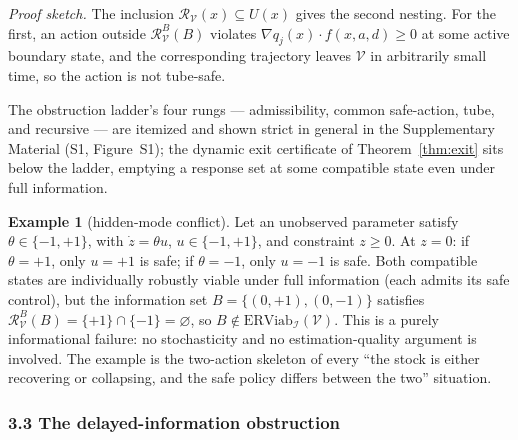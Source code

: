 \documentclass[10pt,twocolumn]{article}
\theoremstyle{definition}
\newtheorem{example}{Example}
\begin{document}
\emph{Proof sketch.} The inclusion \(\mathcal{R}_{\mathcal{V}}(x) \subseteq U(x)\) gives the second nesting. For the first, an action outside \(\mathcal{R}_{\mathcal{V}}^B(B)\) violates \(\nabla q_j(x) \cdot f(x, a, d) \ge 0\) at some active boundary state, and the corresponding trajectory leaves \(\mathcal{V}\) in arbitrarily small time, so the action is not tube-safe.

The obstruction ladder's four rungs --- admissibility, common safe-action, tube, and recursive --- are itemized and shown strict in general in the Supplementary Material (S1, Figure~S1); the dynamic exit certificate of Theorem~\ref{thm:exit} sits below the ladder, emptying a response set at some compatible state even under full information.

\begin{example}[hidden-mode conflict]\label{ex:hidden-mode} Let an unobserved parameter satisfy
\(\theta \in \{-1, +1\}\), with \(\dot z = \theta u\),
\(u \in \{-1, +1\}\), and constraint \(z \ge 0\). At \(z = 0\): if
\(\theta = +1\), only \(u = +1\) is safe; if \(\theta = -1\), only
\(u = -1\) is safe. Both compatible states are individually robustly
viable under full information (each admits its safe control), but the
information set \(B = \{(0, +1), (0, -1)\}\) satisfies
\(\mathcal{R}_{\mathcal{V}}^B(B) = \{+1\} \cap \{-1\} = \varnothing\),
so \(B \notin \mathrm{ERViab}_{\mathcal{I}}(\mathcal{V})\). This is a
purely informational failure: no stochasticity and no estimation-quality
argument is involved. The example is the two-action skeleton of every
``the stock is either recovering or collapsing, and the safe policy
differs between the two'' situation.

\end{example}

\subsubsection{3.3 The delayed-information
obstruction}\label{the-delayed-information-obstruction}
\end{document}
